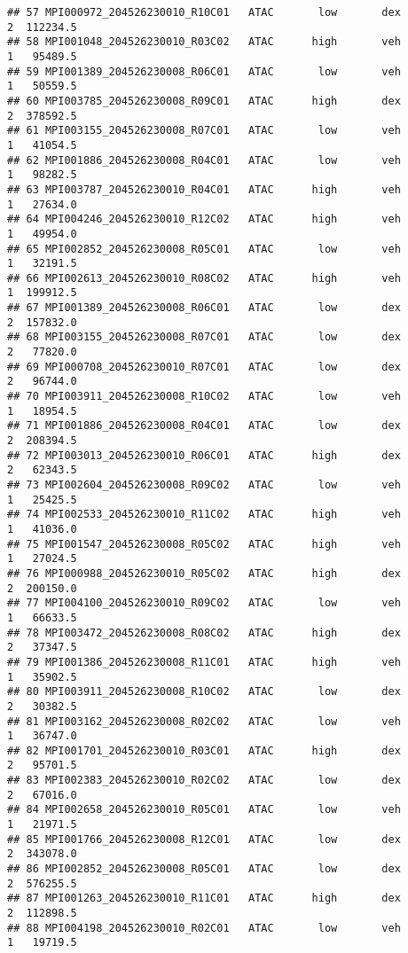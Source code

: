 \documentclass[
]{article}
\begin{document}
\begin{verbatim}
## 57 MPI000972_204526230010_R10C01   ATAC       low       dex         2  112234.5
## 58 MPI001048_204526230010_R03C02   ATAC      high       veh         1   95489.5
## 59 MPI001389_204526230008_R06C01   ATAC       low       veh         1   50559.5
## 60 MPI003785_204526230008_R09C01   ATAC      high       dex         2  378592.5
## 61 MPI003155_204526230008_R07C01   ATAC       low       veh         1   41054.5
## 62 MPI001886_204526230008_R04C01   ATAC       low       veh         1   98282.5
## 63 MPI003787_204526230010_R04C01   ATAC      high       veh         1   27634.0
## 64 MPI004246_204526230010_R12C02   ATAC      high       veh         1   49954.0
## 65 MPI002852_204526230008_R05C01   ATAC       low       veh         1   32191.5
## 66 MPI002613_204526230010_R08C02   ATAC      high       veh         1  199912.5
## 67 MPI001389_204526230008_R06C01   ATAC       low       dex         2  157832.0
## 68 MPI003155_204526230008_R07C01   ATAC       low       dex         2   77820.0
## 69 MPI000708_204526230010_R07C01   ATAC       low       dex         2   96744.0
## 70 MPI003911_204526230008_R10C02   ATAC       low       veh         1   18954.5
## 71 MPI001886_204526230008_R04C01   ATAC       low       dex         2  208394.5
## 72 MPI003013_204526230010_R06C01   ATAC      high       dex         2   62343.5
## 73 MPI002604_204526230008_R09C02   ATAC       low       veh         1   25425.5
## 74 MPI002533_204526230010_R11C02   ATAC      high       veh         1   41036.0
## 75 MPI001547_204526230008_R05C02   ATAC      high       veh         1   27024.5
## 76 MPI000988_204526230010_R05C02   ATAC      high       dex         2  200150.0
## 77 MPI004100_204526230010_R09C02   ATAC       low       veh         1   66633.5
## 78 MPI003472_204526230008_R08C02   ATAC      high       dex         2   37347.5
## 79 MPI001386_204526230008_R11C01   ATAC      high       veh         1   35902.5
## 80 MPI003911_204526230008_R10C02   ATAC       low       dex         2   30382.5
## 81 MPI003162_204526230008_R02C02   ATAC       low       veh         1   36747.0
## 82 MPI001701_204526230010_R03C01   ATAC      high       dex         2   95701.5
## 83 MPI002383_204526230010_R02C02   ATAC       low       dex         2   67016.0
## 84 MPI002658_204526230010_R05C01   ATAC       low       veh         1   21971.5
## 85 MPI001766_204526230008_R12C01   ATAC       low       dex         2  343078.0
## 86 MPI002852_204526230008_R05C01   ATAC       low       dex         2  576255.5
## 87 MPI001263_204526230010_R11C01   ATAC      high       dex         2  112898.5
## 88 MPI004198_204526230010_R02C01   ATAC       low       veh         1   19719.5

\end{verbatim}
\end{document}
